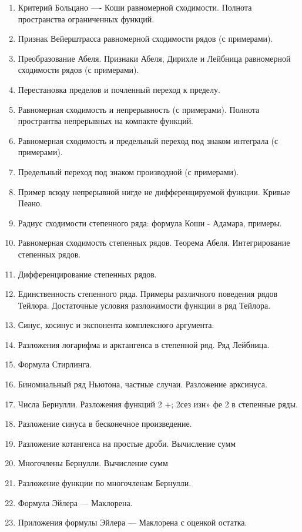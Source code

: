 \documentclass[12pt, a4paper]{book}
\begin{document}
\begin{enumerate}
\item Критерий Больцано —- Коши равномерной сходимости. Полнота пространства ограниченных функций.
\item Признак Вейерштрасса равномерной сходимости рядов (с примерами).
\item Преобразование Абеля. Признаки Абеля, Дирихле и Лейбница равномерной сходимости рядов (с примерами).
\item Перестановка пределов и почленный переход к пределу.
\item Равномерная сходимость и непрерывность (с примерами). Полнота пространтва непрерывных на компакте функций.
\item Равномерная сходимость и предельный переход под знаком интеграла (с примерами).
\item Предельный переход под знаком производной (с примерами).
\item Пример всюду непрерывной нигде не дифференцируемой функции. Кривые Пеано.
\item Радиус сходимости степенного ряда: формула Коши - Адамара, примеры.
\item Равномерная сходимость степенных рядов. Теорема Абеля. Интегрирование степенных рядов.
\item Дифференцирование степенных рядов.
\item Единственность степенного ряда. Примеры различного поведения рядов Тейлора. Достаточные условия разложимости функции в ряд Тейлора.
\item Синус, косинус и экспонента комплексного аргумента.
\item Разложения логарифма и арктангенса в степенной ряд. Ряд Лейбница.
\item Формула Стирлинга.
\item Биномиальный ряд Ньютона, частные случаи. Разложение арксинуса.
\item Числа Бернулли. Разложения функций 2 +; 2сез изн» фе 2 в степенные ряды.
\item Разложение синуса в бесконечное произведение.
\item Разложение котангенса на простые дроби. Вычисление сумм 
\item Многочлены Бернулли. Вычисление сумм 
\item Разложение функции по многочленам Бернулли.
\item Формула Эйлера — Маклорена.
\item Приложения формулы Эйлера — Маклорена с оценкой остатка.

\end{enumerate}
\end{document}
